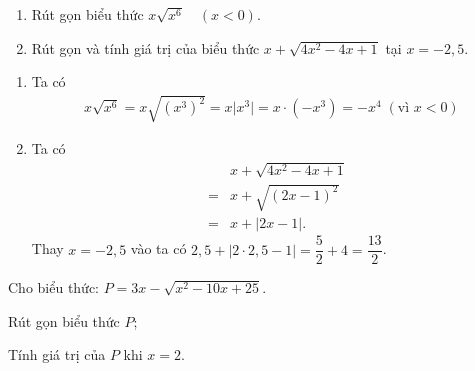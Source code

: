 \begin{vd}
	\begin{enumerate}
	\item Rút gọn biểu thức $x \sqrt{x^6} \quad(x<0)$.
	\item Rút gọn và tính giá trị của biểu thức $x+\sqrt{4 x^2-4 x+1}$ tại $x=-2,5$.
	\end{enumerate}
	\loigiai
	{
	\begin{enumerate}
	\item Ta có \allowdisplaybreaks
	\begin{eqnarray*}
	x\sqrt{x^6}=x\sqrt{\left(x^3\right)^2}=x\big|x^3\big|=x\cdot \left(-x^3\right)=-x^4\;\left(\text{vì }x<0\right)
	\end{eqnarray*}
	\item Ta có \allowdisplaybreaks
	\begin{eqnarray*}
	&&x+\sqrt{4 x^2-4 x+1}\\
	&=& x+\sqrt{\left(2x-1\right)^2}\\
	&=& x+\big|2x-1\big|.
	\end{eqnarray*}
	Thay $x=-2{,}5$ vào ta có $2{,}5+\big|2\cdot 2{,}5-1\big|=\dfrac{5}{2}+4=\dfrac{13}{2}$.
	\end{enumerate}
	}
\end{vd}
\begin{vd}%
	Cho biểu thức: $P = 3x - \sqrt{x^2 - 10x + 25}$.
	\begin{listEX}[2]
	\item Rút gọn biểu thức $P$;
	\item Tính giá trị của $P$ khi $x=2$.
	\end{listEX}
\end{vd}
